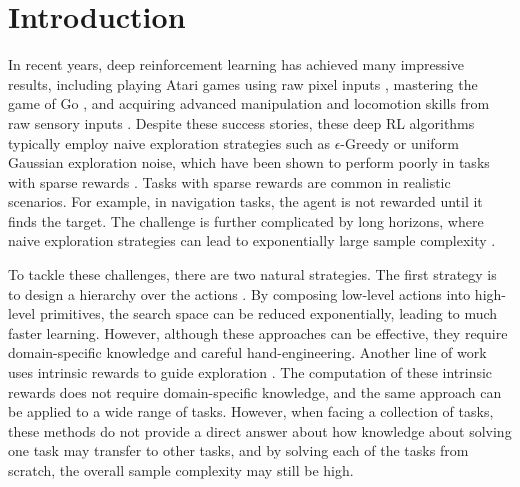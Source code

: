 \documentclass{article} %
\begin{document}
\section{Introduction}



In recent years, deep reinforcement learning has achieved many impressive results, including playing Atari games using raw pixel inputs \citep{NIPS2014_5421, Mnih15, Schulman15TRPO}, mastering the game of Go \citep{ silver2016mastering}, and acquiring advanced manipulation and locomotion skills from raw sensory inputs \citep{Schulman15TRPO, lillicrap2015continuous, watter2015embed, schulman2016high, heess2015learning, levine2016end}.
Despite these success stories, these deep RL algorithms typically employ naive exploration strategies such as $\epsilon$-Greedy or uniform Gaussian exploration noise, which have been shown to perform poorly in tasks with sparse rewards \citep{duan2016benchmarking, houthooft2016variational, bellemare2016unifying}.
Tasks with sparse rewards are common in realistic scenarios. 
For example, in navigation tasks, the agent is not rewarded until it finds the target. The challenge is further complicated by long horizons, where naive exploration strategies can lead to exponentially large sample complexity \citep{osband2014generalization}.

To tackle these challenges, there are two natural strategies.
The first strategy is to design a hierarchy over the actions \citep{parr1998reinforcement, sutton1999between, dietterich2000hierarchical}.
By composing low-level actions into high-level primitives, the search space can be reduced exponentially, leading to much faster learning. However, although these approaches can be effective, they require domain-specific knowledge and careful hand-engineering. Another line of work uses intrinsic rewards to guide exploration \citep{schmidhuber1991curious, schmidhuber2010formal, houthooft2016variational, bellemare2016unifying}.
The computation of these intrinsic rewards does not require domain-specific knowledge, and the same approach can be applied to a wide range of tasks.
However, when facing a collection of tasks, these methods do not provide a direct answer about how knowledge about solving one task may transfer to other tasks, and by solving each of the tasks from scratch, the overall sample complexity may still be high.%
\end{document}
